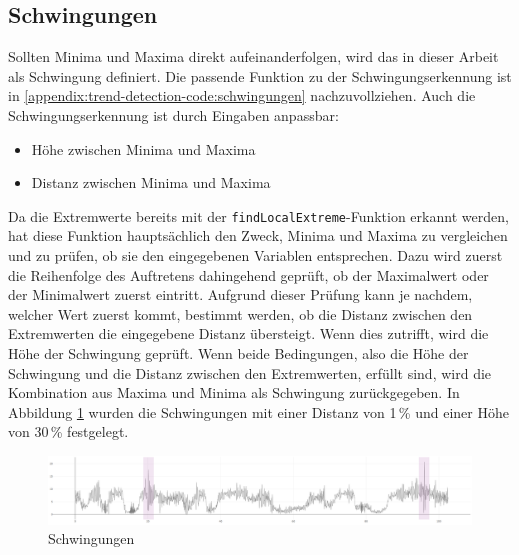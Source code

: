 \subsection{Schwingungen}
Sollten Minima und Maxima direkt aufeinanderfolgen, wird das in dieser Arbeit als Schwingung definiert. Die passende Funktion zu der Schwingungserkennung ist in \ref{appendix:trend-detection-code:schwingungen} nachzuvollziehen. Auch die Schwingungserkennung ist durch Eingaben anpassbar:
\begin{itemize}
    \item Höhe zwischen Minima und Maxima
    \item Distanz zwischen Minima und Maxima
\end{itemize}
Da die Extremwerte bereits mit der \texttt{findLocalExtreme}-Funktion erkannt werden, hat diese Funktion hauptsächlich den Zweck, Minima und Maxima zu vergleichen und zu prüfen, ob sie den eingegebenen Variablen entsprechen. Dazu wird zuerst die Reihenfolge des Auftretens dahingehend geprüft, ob der Maximalwert oder der Minimalwert zuerst eintritt. Aufgrund dieser Prüfung kann je nachdem, welcher Wert zuerst kommt, bestimmt werden, ob die Distanz zwischen den Extremwerten die eingegebene Distanz übersteigt. Wenn dies zutrifft, wird die Höhe der Schwingung geprüft. Wenn beide Bedingungen, also die Höhe der Schwingung und die Distanz zwischen den Extremwerten, erfüllt sind, wird die Kombination aus Maxima und Minima als Schwingung zurückgegeben. In Abbildung \ref{fig:vibrations} wurden die Schwingungen mit einer Distanz von 1\,\% und einer Höhe von 30\,\% festgelegt. 
\begin{figure}[h!]
\centering
\includegraphics[width=\textwidth]{gfx/vibrations.png}
\caption{Schwingungen}
\label{fig:vibrations}
\end{figure}

